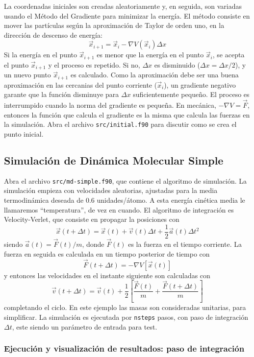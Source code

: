 \documentclass[10pt,a4paper,ssfamily]{exam}
\newcommand{\1}{{\bf 1}}
\newcommand{\2}{{\bf 2}}
\newcommand{\3}{{\bf 3}}
\begin{document}
La coordenadas iniciales son creadas aleatoriamente y, en seguida, son
variadas usando el Método del Gradiente para minimizar la energía. El
método consiste en mover las partículas según la aproximación de Taylor
de orden uno, en la dirección de descenso de energía:
\[
\vec{x}_{i+1} = \vec{x}_i - \nabla V(\vec{x}_i) \Delta x
\]  
Si la energía en el punto $\vec{x}_{i+1}$ es menor que la energía en el
punto $\vec{x}_i$, se acepta el punto $\vec{x}_{i+1}$ y el proceso es
repetido. Si no, $\Delta x$ es disminuido ($\Delta x = \Delta x / 2$), y
un nuevo punto $\vec{x}_{i+1}$ es calculado. Como la aproximación debe
ser una buena aproximación en las cercanias del punto corriente ($\vec{x}_i$), un
gradiente negativo garante que la función disminuye para $\Delta x$
suficientemente pequeño. El proceso es interrumpido cuando la norma del
gradiente es pequeña. En mecánica, $-\nabla V = \vec{F}$, entonces la
función que calcula el gradiente es la misma que calcula las fuerzas en
la simulación. Abra el archivo {\tt src/initial.f90} para
discutir como se crea el punto inicial. 

\subsection{Simulación de Dinámica Molecular Simple}

Abra el archivo {\tt src/md-simple.f90}, que contiene el algoritmo de
simulación. La simulación empieza con velocidades aleatorias, ajustadas
para la media termodinámica deseada de 0.6 unidades/átomo. A esta
energía cinética media le llamaremos ``temperatura'', de vez en cuando.
El algoritmo de integración es Velocity-Verlet, que consiste en propagar
la posiciones con
\[
\vec{x}(t+\Delta t) = \vec{x}(t) + \vec{v}(t)\Delta t + \frac{1}{2}\vec{a}(t)\Delta t^2
\]   
siendo $\vec{a}(t)=\vec{F}(t)/m$, donde $\vec{F}(t)$ es la fuerza en el tiempo corriente. 
La fuerza en seguida es calculada en un tiempo posterior de tiempo con
\[
\vec{F}(t+\Delta t) = -\nabla V[\vec{x}(t)]
\]
y entonces las velocidades en el instante siguiente son calculadas con
\[
\vec{v}(t+\Delta t) = \vec{v}(t) +
\frac{1}{2}\left[
\frac{\vec{F}(t)}{m}+\frac{\vec{F}(t+\Delta t)}{m}\right]
\]
completando el ciclo. En este ejemplo las masas son consideradas
unitarias, para simplificar. La simulación es ejecutada por {\tt nsteps}
pasos, con paso de integración $\Delta t$, este siendo un parámetro de
entrada para test. 

\subsubsection{Ejecución y visualización de resultados: paso de
integración} 
\end{document}
